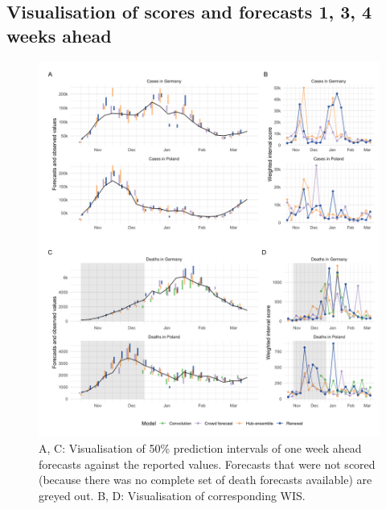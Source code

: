 \documentclass[10pt,letterpaper]{article} %
\providecommand{\DIFaddend}{} %
\DeclareRobustCommand{\DIFaddend}{\DIFOaddend \let\includegraphics\DIFOincludegraphics} %
\begin{document}
\DIFaddend \clearpage

\hypertarget{visualisation-of-scores-and-forecasts-1-3-4-weeks-ahead}{%
\subsection{Visualisation of scores and forecasts 1, 3, 4 weeks
ahead}\label{visualisation-of-scores-and-forecasts-1-3-4-weeks-ahead}}

\begin{figure}[H]
\includegraphics[width=1\linewidth,]{../analysis/plots/figure-forecasts-1} \caption{A, C: Visualisation of 50\% prediction intervals of one week ahead forecasts against the reported values. Forecasts that were not scored (because there was no complete set of death forecasts available) are greyed out. B, D: Visualisation of corresponding WIS.}\label{fig:forecasts-and-truth-1}
\end{figure}
\end{document}
